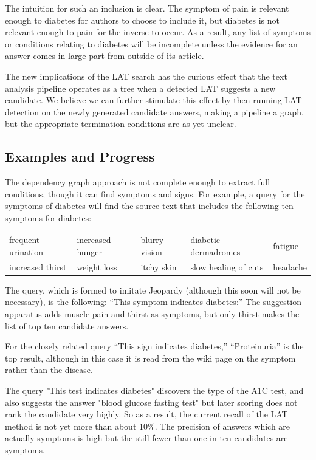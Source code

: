 \documentclass[12pt,letterpaper]{article}
\begin{document}
The intuition for such an inclusion is clear. The symptom of pain is relevant enough to diabetes for authors to choose to include it, but diabetes is not relevant enough to pain for the inverse to occur. As a result, any list of symptoms or conditions relating to diabetes will be incomplete unless the evidence for an answer comes in large part from outside of its article.

The new implications of the LAT search has the curious effect that the text analysis pipeline operates as a tree when a detected LAT suggests a new candidate. We believe we can further stimulate this effect by then running LAT detection on the newly generated candidate answers, making a pipeline a graph, but the appropriate termination conditions are as yet unclear.

\subsection{Examples and Progress}
The dependency graph approach is not complete enough to extract full conditions, though it can find symptoms and signs. For example, a query for the symptoms of diabetes will find the source text that includes the following ten symptoms for diabetes:

\medskip
\begin{tabular}{lllll}
frequent urination & increased hunger & blurry vision & 
diabetic dermadromes & fatigue \\
increased thirst & weight loss & itchy skin & slow healing of cuts & headache  \\
\end{tabular}
\medskip

The query, which is formed to imitate Jeopardy (although this soon will not be necessary), is the following: ``This symptom indicates 
diabetes:'' The suggestion apparatus adds muscle pain and thirst as symptoms, but only thirst makes the list of top ten candidate answers.

For the closely related query ``This sign indicates diabetes,'' ``Proteinuria'' is the top result, although in this case it is read from the wiki page on the symptom rather than the disease.

The query "This test indicates diabetes" discovers the type of the A1C test, and also suggests the answer "blood glucose fasting test" but later scoring does not rank the candidate very highly.
So as a result, the current recall of the LAT method is not yet more than about 10\%. The precision of answers which are actually symptoms is high but the still fewer than one in ten candidates are symptoms.
\end{document}
